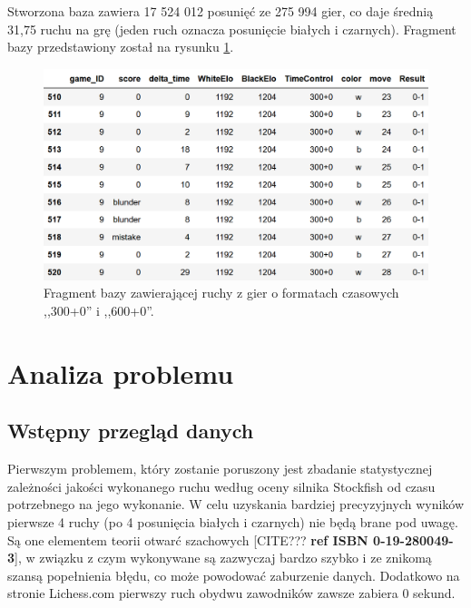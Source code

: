 \documentclass[inzynierska]{pwr_wmat_praca_dyplomowa}
\theoremstyle{plain}
\numberwithin{theorem}{chapter}
\theoremstyle{definition}
\numberwithin{theorem}{chapter}
\begin{document}
Stworzona baza zawiera 17 524 012 posunięć ze 275 994 gier, co daje średnią 31,75 ruchu na grę (jeden ruch oznacza posunięcie białych i czarnych). Fragment bazy przedstawiony został na rysunku \ref{rys:baza_ruchow}. 
\begin{figure}[H]
	\centering
	\includegraphics[width=\textwidth]{danee.png}
	\caption{Fragment bazy zawierającej ruchy z gier o formatach czasowych ,,300+0'' i ,,600+0''.}
	\label{rys:baza_ruchow}
\end{figure}




\section{Analiza problemu}

\subsection{Wstępny przegląd danych}



Pierwszym problemem, który zostanie poruszony jest zbadanie statystycznej zależności jakości wykonanego ruchu według oceny silnika Stockfish od czasu potrzebnego na jego wykonanie. W celu uzyskania bardziej precyzyjnych wyników pierwsze 4 ruchy (po 4 posunięcia białych i czarnych) nie będą brane pod uwagę. Są one elementem teorii otwarć szachowych [CITE??? \textbf{ref ISBN 0-19-280049-3}], w związku z czym wykonywane są zazwyczaj bardzo szybko i ze znikomą szansą popełnienia błędu, co może powodować zaburzenie danych. Dodatkowo na stronie Lichess.com pierwszy ruch obydwu zawodników zawsze zabiera 0 sekund.
\end{document}
